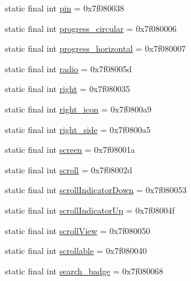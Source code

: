 \begin{CompactItemize}
\item 
static final int \hyperlink{classandroid_1_1support_1_1graphics_1_1drawable_1_1_r_1_1id_392bb3a7fa3379ce60f0cce20b7202ee}{pin} = 0x7f080038
\item 
static final int \hyperlink{classandroid_1_1support_1_1graphics_1_1drawable_1_1_r_1_1id_57e07a29ab88383537f4d69be9dfca3a}{progress\_\-circular} = 0x7f080006
\item 
static final int \hyperlink{classandroid_1_1support_1_1graphics_1_1drawable_1_1_r_1_1id_490d493841e25cc420971dcc5abd0d52}{progress\_\-horizontal} = 0x7f080007
\item 
static final int \hyperlink{classandroid_1_1support_1_1graphics_1_1drawable_1_1_r_1_1id_9f4b98652c6341883664f47ef7700cae}{radio} = 0x7f08005d
\item 
static final int \hyperlink{classandroid_1_1support_1_1graphics_1_1drawable_1_1_r_1_1id_043bf4fbb46443bdbda868ebceb3b659}{right} = 0x7f080035
\item 
static final int \hyperlink{classandroid_1_1support_1_1graphics_1_1drawable_1_1_r_1_1id_70ab3cedc2a740c3ae09f3d630d990b9}{right\_\-icon} = 0x7f0800a9
\item 
static final int \hyperlink{classandroid_1_1support_1_1graphics_1_1drawable_1_1_r_1_1id_36475d3142060d01b9d547e88a66b2ea}{right\_\-side} = 0x7f0800a5
\item 
static final int \hyperlink{classandroid_1_1support_1_1graphics_1_1drawable_1_1_r_1_1id_90cb3d85b590166151c799fbe79e411c}{screen} = 0x7f08001a
\item 
static final int \hyperlink{classandroid_1_1support_1_1graphics_1_1drawable_1_1_r_1_1id_25204cee2d30e30feefcc3b1936bd91b}{scroll} = 0x7f08002d
\item 
static final int \hyperlink{classandroid_1_1support_1_1graphics_1_1drawable_1_1_r_1_1id_87b2a046a127c7f9b443fffa6b98b78f}{scrollIndicatorDown} = 0x7f080053
\item 
static final int \hyperlink{classandroid_1_1support_1_1graphics_1_1drawable_1_1_r_1_1id_3138882dd3dc53bf8796c8a878d93dcf}{scrollIndicatorUp} = 0x7f08004f
\item 
static final int \hyperlink{classandroid_1_1support_1_1graphics_1_1drawable_1_1_r_1_1id_061e9e47c275b932626156688684f74a}{scrollView} = 0x7f080050
\item 
static final int \hyperlink{classandroid_1_1support_1_1graphics_1_1drawable_1_1_r_1_1id_6410ff1bd6be1de24b3e23463a7aa1cc}{scrollable} = 0x7f080040
\item 
static final int \hyperlink{classandroid_1_1support_1_1graphics_1_1drawable_1_1_r_1_1id_8db249d4d73492bf3cea9284084b9b7c}{search\_\-badge} = 0x7f080068

\end{CompactItemize}
